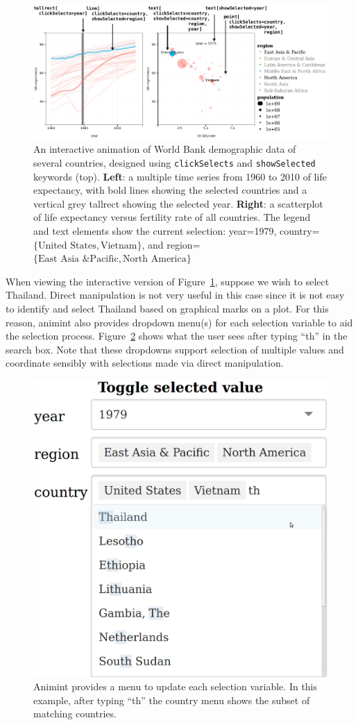 \documentclass[journal]{vgtc}\usepackage[]{graphicx}\usepackage[]{color}
\begin{document}
\begin{figure}[htp]
  \centering
  \includegraphics[width=\textwidth]{figure-1}
  \caption{An interactive animation of World Bank demographic data of
    several countries, designed using \texttt{clickSelects} and
    \texttt{showSelected} keywords (top).  \textbf{Left}: a multiple
    time series from 1960 to 2010 of life expectancy, with bold lines
    showing the selected countries and a vertical grey tallrect
    showing the selected year. \textbf{Right}: a scatterplot of life
    expectancy versus fertility rate of all countries. The legend and
    text elements show the current selection: year=1979,
    country=$\{\textrm{United States}, \textrm{Vietnam}\}$, and
    region=$\{\textrm{East Asia \& Pacific}, \textrm{North
      America}\}$}
  \label{fig:worldbank}
\end{figure}

When viewing the interactive version of Figure~\ref{fig:worldbank}, suppose
we wish to select Thailand. Direct manipulation is not very useful in 
this case since it is not easy to identify and select Thailand based
on graphical marks on a plot. For this reason, animint also provides 
dropdown menu(s) for each selection variable to aid the selection process.
Figure~\ref{fig:widgets} shows what the user sees after typing ``th'' in 
the search box. Note that these dropdowns support selection of multiple
values and coordinate sensibly with selections made via direct manipulation.

\begin{figure}[htp]
  \centering
  \includegraphics[width=0.5\columnwidth]{Screenshot-toggle-selected-value}
  \caption{Animint provides a menu to update each selection
    variable. In this example, after typing ``th'' the country menu
    shows the subset of matching countries.}
  \label{fig:widgets}
\end{figure}
\end{document}
